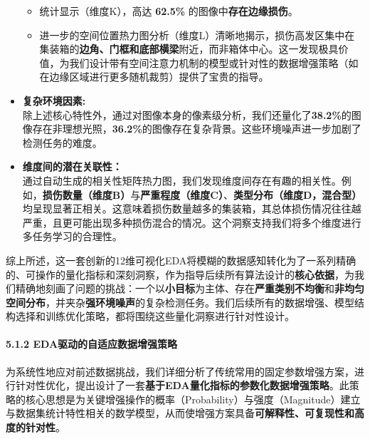 \documentclass[
]{article}
\begin{document}
\begin{itemize}
  \begin{itemize}
  \item
    统计显示（维度K），高达 \textbf{62.5\%}
    的图像中\textbf{存在边缘损伤}。
  \item
    进一步的空间位置热力图分析（维度L）清晰地揭示，损伤高发区集中在集装箱的\textbf{边角、门框和底部横梁}附近，而非箱体中心。这一发现极具价值，为我们设计带有空间注意力机制的模型或针对性的数据增强策略（如在边缘区域进行更多随机裁剪）提供了宝贵的指导。
  \end{itemize}
\item
  \textbf{复杂环境因素:} \\
  除上述核心特性外，通过对图像本身的像素级分析，我们还量化了\textbf{38.2\%}的图像存在非理想光照，\textbf{36.2\%}的图像存在复杂背景。这些环境噪声进一步加剧了检测任务的难度。
\item
  \textbf{维度间的潜在关联性：} \\
  通过自动生成的相关性矩阵热力图，我们发现维度间存在有趣的相关性。例如，\textbf{损伤数量（维度B）}与\textbf{严重程度（维度C）}、\textbf{类型分布（维度D，混合型）}均呈现显著正相关。这意味着损伤数量越多的集装箱，其总体损伤情况往往越严重，且更可能出现多种损伤混合的情况。这个洞察支持我们将多个维度进行多任务学习的合理性。
\end{itemize}

综上所述，这一套创新的12维可视化EDA将模糊的数据感知转化为了一系列精确的、可操作的量化指标和深刻洞察，作为指导后续所有算法设计的\textbf{核心依据}，为我们精确地刻画了问题的挑战：一个以\textbf{小目标}为主体、存在\textbf{严重类别不均衡}和\textbf{非均匀空间分布}，并夹杂\textbf{强环境噪声}的复杂检测任务。我们后续所有的数据增强、模型结构选择和训练优化策略，都将围绕这些量化洞察进行针对性设计。

\paragraph{5.1.2
EDA驱动的自适应数据增强策略}\label{512-edaux9a71ux52a8ux7684ux81eaux9002ux5e94ux6570ux636eux589eux5f3aux7b56ux7565}

为系统性地应对前述数据挑战，我们详细分析了传统常用的固定参数增强方案，进行针对性优化，提出设计了一套\textbf{基于EDA量化指标的参数化数据增强策略}。此策略的核心思想是为关键增强操作的概率（Probability）与强度（Magnitude）建立与数据集统计特性相关的数学模型，从而使增强方案具备\textbf{可解释性、可复现性和高度的针对性}。
\end{document}
